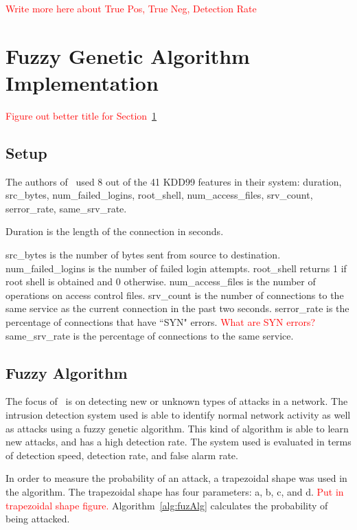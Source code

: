 \documentclass{sig-alternate}
\newcommand{\mycomment}[1]{\textcolor{red}{#1}}
\begin{document}
\mycomment{Write more here about True Pos, True Neg, Detection Rate}




\section{Fuzzy Genetic Algorithm Implementation}
\label{sec:fuzGenAlgImp}
\mycomment{Figure out better title for Section~\ref{sec:fuzGenAlgImp}}

\subsection{Setup}
The authors of~\cite{6496342, 6559603} used 8 out of the 41 KDD99 features in their system: duration, src\_bytes, num\_failed\_logins, root\_shell, num\_access\_files, srv\_count, serror\_rate, same\_srv\_rate.

Duration is the length of the connection in seconds. 

src\_bytes is the number of bytes sent from source to destination. num\_failed\_logins is the number of failed login attempts. root\_shell returns 1 if root shell is obtained and 0 otherwise. num\_access\_files is the number of operations on access control files. srv\_count is the number of connections to the same service as the current connection in the past two seconds. serror\_rate is the percentage of connections that have ``SYN" errors.
\mycomment{What are SYN errors?}
 same\_srv\_rate is the percentage of connections to the same service.~\cite{KDD99Features}




\subsection{Fuzzy Algorithm}
The focus of~\cite{6496342, 6559603} is on detecting new or unknown types of attacks in a network. The intrusion detection system used is able to identify normal network activity as well as attacks using a fuzzy genetic algorithm. This kind of algorithm is able to learn new attacks, and has a high detection rate. The system used is evaluated in terms of detection speed, detection rate, and false alarm rate.

In order to measure the probability of an attack, a trapezoidal shape was used in the algorithm. The trapezoidal shape has four parameters: a, b, c, and d. 
\mycomment{Put in trapezoidal shape figure.} Algorithm~\ref{alg:fuzAlg} calculates the probability of being attacked.
\end{document}
